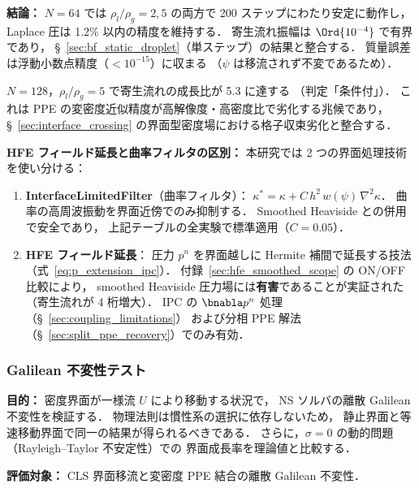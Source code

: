 \noindent\textbf{結論：}
$N = 64$ では $\rho_l/\rho_g = 2, 5$ の両方で 200 ステップにわたり安定に動作し，
Laplace 圧は 1.2\% 以内の精度を維持する．
寄生流れ振幅は $\Ord{10^{-4}}$ で有界であり，
§~\ref{sec:bf_static_droplet}（単ステップ）の結果と整合する．
質量誤差は浮動小数点精度（$< 10^{-15}$）に収まる
（$\psi$ は移流されず不変であるため）．

$N = 128$，$\rho_l/\rho_g = 5$ で寄生流れの成長比が 5.3 に達する
（判定「条件付」）．
これは PPE の変密度近似精度が高解像度・高密度比で劣化する兆候であり，
§~\ref{sec:interface_crossing} の界面型密度場における格子収束劣化と整合する．

\noindent\textbf{HFE フィールド延長と曲率フィルタの区別：}
本研究では 2 つの界面処理技術を使い分ける：
\begin{enumerate}[noitemsep]
  \item \textbf{InterfaceLimitedFilter}（曲率フィルタ）：
        $\kappa^* = \kappa + C\,h^2\,w(\psi)\,\nabla^2\kappa$．
        曲率の高周波振動を界面近傍でのみ抑制する．
        Smoothed Heaviside との併用で安全であり，
        上記テーブルの全実験で標準適用（$C = 0.05$）．
  \item \textbf{HFE フィールド延長}：
        圧力 $p^n$ を界面越しに Hermite 補間で延長する技法（式~\eqref{eq:p_extension_ipc}）．
        付録~\ref{sec:hfe_smoothed_scope} の ON/OFF 比較により，
        smoothed Heaviside 圧力場には\textbf{有害}であることが実証された
        （寄生流れが 4 桁増大）．
        IPC の $\bnabla p^n$ 処理（§~\ref{sec:coupling_limitations}）
        および分相 PPE 解法（§~\ref{sec:split_ppe_recovery}）でのみ有効．
\end{enumerate}

\subsubsection{Galilean 不変性テスト}
\label{sec:galilean_invariance}

\noindent\textbf{目的：}
密度界面が一様流 $U$ により移動する状況で，
NS ソルバの離散 Galilean 不変性を検証する．
物理法則は慣性系の選択に依存しないため，
静止界面と等速移動界面で同一の結果が得られるべきである．
さらに，$\sigma = 0$ の動的問題（Rayleigh--Taylor 不安定性）での
界面成長率を理論値と比較する．

\noindent\textbf{評価対象：}
CLS 界面移流と変密度 PPE 結合の離散 Galilean 不変性．

